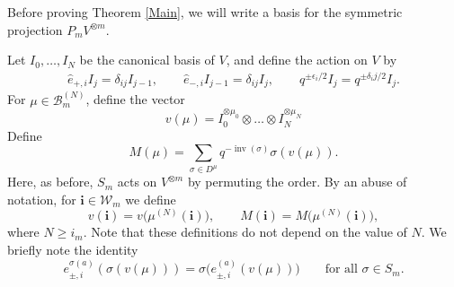 \documentclass[pdftex]{sigma}
\numberwithin{equation}{section}
\DeclareMathOperator{\inv}{inv}
\newcommand{\zz}{{\mu}}
\newcommand{\ii}{{\mathbf{i}}}
\newcommand{\zo}{{(\mu)}}
\begin{document}
Before proving Theorem \ref{Main}, we will write a basis for the symmetric projection $P_mV^{\otimes m}$.

Let $ I_0,\dots,I_N $ be the canonical basis of $ V $, and define the action on $ V $ by 	
\begin{gather}
\hat{e}_{+,i}I_j=\delta_{ij}I_{j-1},\qquad
\hat{e}_{-,i}I_{j-1}=\delta_{ij}I_j,\qquad
q^{\pm \epsilon_i/2}I_j=q^{\pm \delta_ij/2}I_j.\label{21}
\end{gather}
For $\mu \in \mathcal{B}_m^{(N)}$, define the vector
\begin{equation*}%
v\zo =I_0^{\otimes \mu_0} \otimes \dots \otimes I_N^{\otimes \mu_N}
\end{equation*}
Define
\begin{equation*}
M(\zz) = \sum_{\sigma \in D^{\mu}}q^{-\inv (\sigma)} \sigma (v(\mu)).
\end{equation*}
Here, as before, $S_m $ acts on $ V^{\otimes m} $ by permuting the order.
By an abuse of notation, for $\ii \in \mathcal{W}_m$ we define
\[
v(\ii) = v\big(\mu^{(N)}(\ii)\big), \qquad M(\ii) = M\big(\mu^{(N)}(\ii)\big),
\]
where $N \geq i_m$. Note that these definitions do not depend on the value of $N$.
We briefly note the identity
\begin{equation}\label{Brief}
e^{\sigma(a)}_{\pm,i} ( \sigma(v(\mu)) ) = \sigma\big( e^{(a)}_{\pm,i} ( v(\mu) ) \big) \qquad \text{for all } \sigma \in S_m.
\end{equation}
\end{document}
